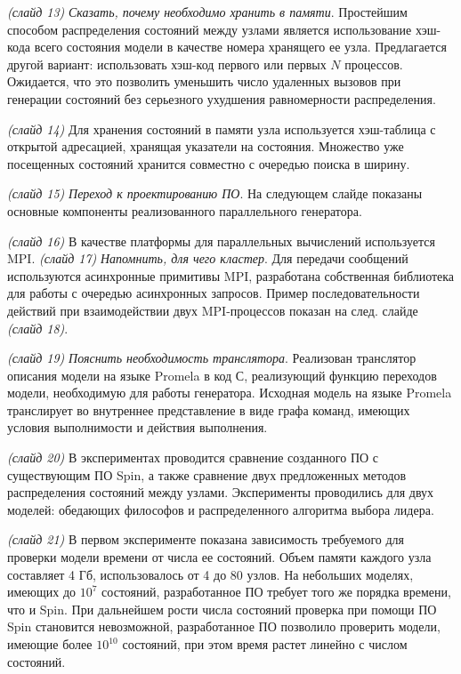 \documentclass[a4paper,12pt,notitlepage]{article}
\begin{document}
\emph{(слайд 13)} \emph{Сказать, почему необходимо хранить в памяти}. Простейшим
способом распределения состояний между узлами является использование хэш-кода всего
состояния модели в качестве номера хранящего ее узла. Предлагается другой вариант:
использовать хэш-код первого или первых $N$ процессов. Ожидается, что это позволить
уменьшить число удаленных вызовов при генерации состояний без серьезного ухудшения
равномерности распределения.

\emph{(слайд 14)} Для хранения состояний в памяти узла используется хэш-таблица с открытой
адресацией, хранящая указатели на состояния. Множество уже посещенных состояний хранится
совместно с очередью поиска в ширину.

\emph{(слайд 15)} \emph{Переход к проектированию ПО}. На следующем слайде показаны
основные компоненты реализованного параллельного генератора.

\emph{(слайд 16)} В качестве платформы для параллельных вычислений используется MPI.
\emph{(слайд 17)} \emph{Напомнить, для чего кластер}. Для передачи сообщений используются
асинхронные примитивы MPI, разработана собственная библиотека для работы с очередью
асинхронных запросов. Пример последовательности действий при взаимодействии двух
MPI-процессов показан на след. слайде \emph{(слайд 18)}.

\emph{(слайд 19)} \emph{Пояснить необходимость транслятора}. Реализован транслятор описания
модели на языке Promela в код С, реализующий функцию переходов модели, необходимую для
работы генератора. Исходная модель на языке Promela транслирует во внутреннее
представление в виде графа команд, имеющих условия выполнимости и действия выполнения.

\emph{(слайд 20)} В экспериментах проводится сравнение созданного ПО с существующим ПО
Spin, а также сравнение двух предложенных методов распределения состояний между
узлами. Эксперименты проводились для двух моделей: обедающих философов и распределенного
алгоритма выбора лидера.

\emph{(слайд 21)} В первом эксперименте показана зависимость требуемого для проверки
модели времени от числа ее состояний. Объем памяти каждого узла составляет 4 Гб,
использовалось от 4 до 80 узлов. На небольших моделях, имеющих до $10^7$ состояний,
разработанное ПО требует того же порядка времени, что и Spin. При дальнейшем рости числа
состояний проверка при помощи ПО Spin становится невозможной, разработанное ПО позволило
проверить модели, имеющие более $10^{10}$ состояний, при этом время растет линейно с
числом состояний.
\end{document}
